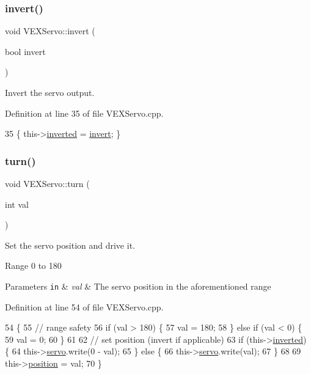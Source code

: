 \subsubsection{\texorpdfstring{invert()}{invert()}}
{\footnotesize\ttfamily void V\+E\+X\+Servo\+::invert (\begin{DoxyParamCaption}\item[{bool}]{invert }\end{DoxyParamCaption})}



Invert the servo output. 



Definition at line 35 of file V\+E\+X\+Servo.\+cpp.


\begin{DoxyCode}
35 \{ this->\hyperlink{class_v_e_x_servo_a660e5b8a09906d86a4c7b6c7d88042c5}{inverted} = \hyperlink{class_v_e_x_servo_a9bd31afec53e4c45d264c2480b0c0e5e}{invert}; \}
\end{DoxyCode}
\mbox{\label{class_v_e_x_servo_a2de6039ce58da12f9649fe1e04dc8ea9}} 
\subsubsection{\texorpdfstring{turn()}{turn()}}
{\footnotesize\ttfamily void V\+E\+X\+Servo\+::turn (\begin{DoxyParamCaption}\item[{int}]{val }\end{DoxyParamCaption})}



Set the servo position and drive it. 

Range 0 to 180 
\begin{DoxyParams}[1]{Parameters}
\mbox{\tt in}  & {\em val} & The servo position in the aforementioned range \\
\hline
\end{DoxyParams}


Definition at line 54 of file V\+E\+X\+Servo.\+cpp.


\begin{DoxyCode}
54                            \{
55     \textcolor{comment}{// range safety}
56     \textcolor{keywordflow}{if} (val > 180) \{
57         val = 180;
58     \} \textcolor{keywordflow}{else} \textcolor{keywordflow}{if} (val < 0) \{
59         val = 0;
60     \}
61 
62     \textcolor{comment}{// set position (invert if applicable)}
63     \textcolor{keywordflow}{if} (this->\hyperlink{class_v_e_x_servo_a660e5b8a09906d86a4c7b6c7d88042c5}{inverted}) \{
64         this->\hyperlink{class_v_e_x_servo_ab82f78aa9ea59ca24cec69e3e7563c3f}{servo}.write(0 - val);
65     \} \textcolor{keywordflow}{else} \{
66         this->\hyperlink{class_v_e_x_servo_ab82f78aa9ea59ca24cec69e3e7563c3f}{servo}.write(val);
67     \}
68 
69     this->\hyperlink{class_v_e_x_servo_aa277013ab5c085b050b9a28f61e11e8b}{position} = val;
70 \}
\end{DoxyCode}


